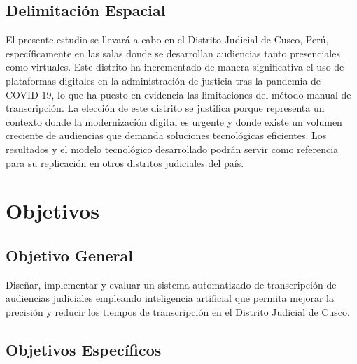 \documentclass[12pt,a4paper,oneside]{article}
\begin{document}
\subsection{Delimitaci\'on Espacial}

El presente estudio se llevar\'a a cabo en el Distrito Judicial de Cusco, Per\'u, espec\'ificamente en las salas donde se desarrollan audiencias tanto presenciales como virtuales. Este distrito ha incrementado de manera significativa el uso de plataformas digitales en la administraci\'on de justicia tras la pandemia de COVID-19, lo que ha puesto en evidencia las limitaciones del m\'etodo manual de transcripci\'on. La elecci\'on de este distrito se justifica porque representa un contexto donde la modernizaci\'on digital es urgente y donde existe un volumen creciente de audiencias que demanda soluciones tecnol\'ogicas eficientes. Los resultados y el modelo tecnol\'ogico desarrollado podr\'an servir como referencia para su replicaci\'on en otros distritos judiciales del pa\'is.


\section{Objetivos}

\subsection{Objetivo General}

Dise\~nar, implementar y evaluar un sistema automatizado de transcripci\'on de audiencias judiciales empleando inteligencia artificial que permita mejorar la precisi\'on y reducir los tiempos de transcripci\'on en el Distrito Judicial de Cusco.

\subsection{Objetivos Espec\'ificos}
\end{document}

